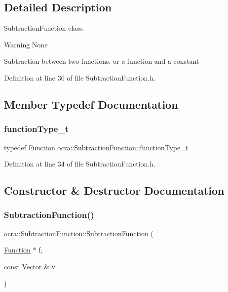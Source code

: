 \subsection{Detailed Description}
Subtraction\+Function class. 

\begin{DoxyWarning}{Warning}
None
\end{DoxyWarning}
Subtraction between two functions, or a function and a constant 

Definition at line 30 of file Subtraction\+Function.\+h.



\subsection{Member Typedef Documentation}
\hypertarget{classocra_1_1SubtractionFunction_a371966d5def8140a019099fc4346f413}{}\label{classocra_1_1SubtractionFunction_a371966d5def8140a019099fc4346f413} 
\subsubsection{\texorpdfstring{function\+Type\+\_\+t}{functionType\_t}}
{\footnotesize\ttfamily typedef \hyperlink{classocra_1_1Function}{Function} \hyperlink{classocra_1_1SubtractionFunction_a371966d5def8140a019099fc4346f413}{ocra\+::\+Subtraction\+Function\+::function\+Type\+\_\+t}}



Definition at line 34 of file Subtraction\+Function.\+h.



\subsection{Constructor \& Destructor Documentation}
\hypertarget{classocra_1_1SubtractionFunction_a65b777d9cbd05c1e14063fd0bb99f262}{}\label{classocra_1_1SubtractionFunction_a65b777d9cbd05c1e14063fd0bb99f262} 
\subsubsection{\texorpdfstring{Subtraction\+Function()}{SubtractionFunction()}\hspace{0.1cm}{\footnotesize\ttfamily [1/2]}}
{\footnotesize\ttfamily ocra\+::\+Subtraction\+Function\+::\+Subtraction\+Function (\begin{DoxyParamCaption}\item[{\hyperlink{classocra_1_1Function}{Function} $\ast$}]{f,  }\item[{const Vector \&}]{v }\end{DoxyParamCaption})}

